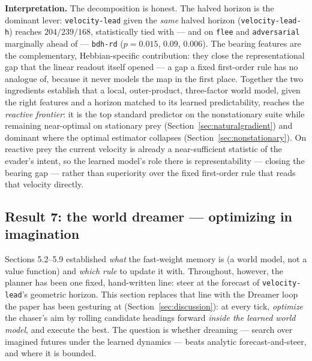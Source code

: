 \documentclass[11pt]{article}
\begin{document}
\textbf{Interpretation.} The decomposition is honest. The halved horizon is the dominant lever:
\texttt{velocity-lead} given the \emph{same} halved horizon (\texttt{velocity-lead-h}) reaches
$204 / 239 / 168$, statistically tied with --- and on \texttt{flee} and \texttt{adversarial}
marginally ahead of --- \texttt{bdh-rd} ($p = 0.015$, $0.09$, $0.006$). The bearing features are the
complementary, Hebbian-specific contribution: they close the representational gap that the linear
readout itself opened --- a gap a fixed first-order rule has no analogue of, because it never models
the map in the first place. Together the two ingredients establish that a local, outer-product,
three-factor world model, given the right features and a horizon matched to its learned
predictability, reaches the \emph{reactive frontier}: it is the top standard predictor on the
nonstationary suite while remaining near-optimal on stationary prey
(Section~\ref{sec:naturalgradient}) and dominant where the optimal estimator collapses
(Section~\ref{sec:nonstationary}). On reactive prey the current velocity is already a near-sufficient
statistic of the evader's intent, so the learned model's role there is representability --- closing
the bearing gap --- rather than superiority over the fixed first-order rule that reads that velocity
directly.

\subsection{Result 7: the world dreamer --- optimizing in imagination}\label{sec:dreamer}

Sections 5.2--5.9 established \emph{what} the fast-weight memory is (a world model, not a value
function) and \emph{which rule} to update it with. Throughout, however, the planner has been one
fixed, hand-written line: steer at the forecast of \texttt{velocity-lead}'s geometric horizon. This
section replaces that line with the Dreamer loop the paper has been gesturing at
(Section~\ref{sec:discussion}): at every tick, \emph{optimize} the chaser's aim by rolling candidate
headings forward \emph{inside the learned world model}, and execute the best. The question is whether
dreaming --- search over imagined futures under the learned dynamics --- beats analytic
forecast-and-steer, and where it is bounded.
\end{document}
